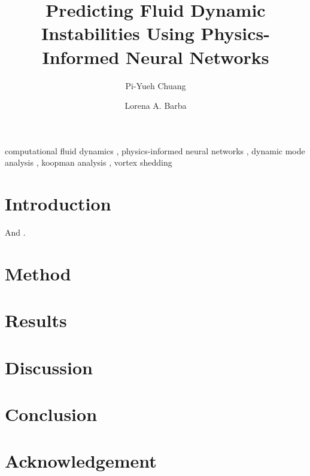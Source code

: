 \documentclass[5p, twocolumn, times, sort&compress]{elsarticle}
\begin{document}
    \begin{frontmatter}
        \title{%
            Predicting Fluid Dynamic Instabilities Using Physics-Informed Neural Networks%
        }

        \author[1]{Pi-Yueh Chuang}
        \author[1]{Lorena A. Barba}

        \begin{abstract}
            \lipsum[1]%
        \end{abstract}

        \begin{keyword}
            computational fluid dynamics \sep
            physics-informed neural networks \sep
            dynamic mode analysis \sep
            koopman analysis \sep
            vortex shedding
        \end{keyword}
    \end{frontmatter}

    \section{Introduction}
    \lipsum[2] And \cite{chen_variants_2012, rowley_spectral_2009, rahaman_spectral_2019}.

    \section{Method}
    \lipsum[3]

    \section{Results}
    \lipsum[4]

    \section{Discussion}
    \lipsum[5]

    \section{Conclusion}
    \lipsum[6]

    \section*{Acknowledgement}
    \lipsum[7]

    
\end{document}
